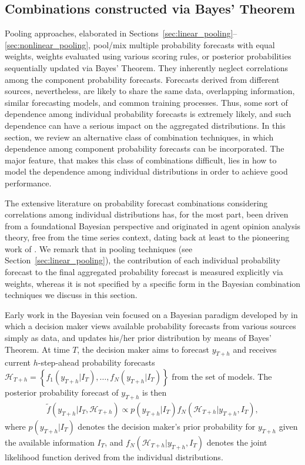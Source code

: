 \documentclass[11pt]{article}
\begin{document}
\subsection{Combinations constructed via Bayes' Theorem}
\label{sec:bayesian_comb}

Pooling approaches, elaborated in Sections~\ref{sec:linear_pooling}--\ref{sec:nonlinear_pooling}, pool/mix multiple probability forecasts with equal weights, weights evaluated using various scoring rules, or posterior probabilities sequentially updated via Bayes' Theorem. They inherently neglect correlations among the component probability forecasts. Forecasts derived from different sources, nevertheless, are likely to share the same data, overlapping information, similar forecasting models, and common training processes. Thus, some sort of dependence among individual probability forecasts is extremely likely, and such dependence can have a serious impact on the aggregated distributions. In this section, we review an alternative class of combination techniques, in which dependence among component probability forecasts can be incorporated. The major feature, that makes this class of combinations difficult, lies in how to model the dependence among individual distributions in order to achieve good performance.

The extensive literature on probability forecast combinations considering correlations among individual distributions has, for the most part, been driven from a foundational Bayesian perspective and originated in agent opinion analysis theory, free from the time series context, dating back at least to the pioneering work of \citet{Winkler1968-uw}. We remark that in pooling techniques (see Section~\ref{sec:linear_pooling}), the contribution of each individual probability forecast to the final aggregated probability forecast is measured explicitly via weights, whereas it is not specified by a specific form in the Bayesian combination techniques we discuss in this section.

Early work in the Bayesian vein focused on a Bayesian paradigm developed by \citet{Morris1974-yh,Morris1977-xl} in which a decision maker views available probability forecasts from various sources simply as data, and updates his/her prior distribution by means of Bayes' Theorem. At time $T$, the decision maker aims to forecast $y_{T+h}$ and receives current $h$-step-ahead probability forecasts $\mathcal{H}_{T+h} = \left\{f_{1}(y_{T+h}|I_{T}), \dots, f_{N}(y_{T+h}|I_{T})\right\}$ from the set of models. The posterior probability forecast of $y_{T+h}$ is then
\begin{align}
  \label{eq:bayes_theorem}
  \tilde{f}\left(y_{T+h} | I_{T}, \mathcal{H}_{T+h}\right) \propto p\left(y_{T+h} | I_{T}\right) f_{N}\left(\mathcal{H}_{T+h} | y_{T+h}, I_{T}\right),
\end{align}
where $p\left(y_{T+h} | I_{T}\right)$ denotes the decision maker's prior probability for $y_{T+h}$ given the available information $I_{T}$, and $f_{N}\left(\mathcal{H}_{T+h} | y_{T+h}, I_{T}\right)$ denotes the joint likelihood function derived from the individual distributions.
\end{document}
